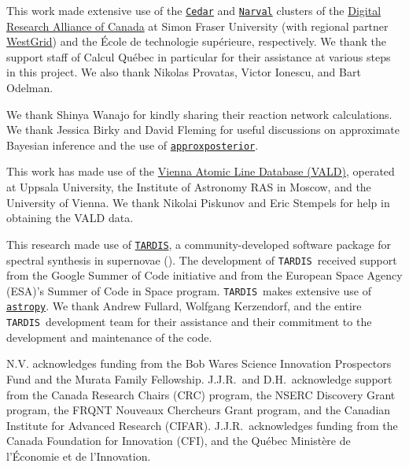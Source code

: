 \documentclass[twocolumn, twocolappendix]{aastex63}
\def\TARDIS{\texttt{TARDIS}}
\def\approxposterior{\texttt{approxposterior}}
\begin{document}
\begin{itemize}
This work made extensive use of the \href{https://docs.alliancecan.ca/wiki/Cedar}{\texttt{Cedar}} and \href{https://docs.alliancecan.ca/wiki/Narval/en}{\texttt{Narval}} clusters of the \href{https://alliancecan.ca/en}{Digital Research Alliance of Canada} at Simon Fraser University (with regional partner \href{https://www.westgrid.ca/}{WestGrid}) and the {\'E}cole de technologie sup{\'e}rieure, respectively. We thank the support staff of Calcul Qu{\'e}bec in particular for their assistance at various steps in this project. We also thank Nikolas Provatas, Victor Ionescu, and Bart Odelman.

We thank Shinya Wanajo for kindly sharing their reaction network calculations. We thank Jessica Birky and David Fleming for useful discussions on approximate Bayesian inference and the use of \href{https://dflemin3.github.io/approxposterior/index.html}{\approxposterior}.

This work has made use of the \href{http://vald.astro.uu.se/~vald/php/vald.php}{Vienna Atomic Line Database (VALD)}, operated at Uppsala University, the Institute of Astronomy RAS in Moscow, and the University of Vienna. We thank Nikolai Piskunov and Eric Stempels for help in obtaining the VALD data.

This research made use of \href{https://tardis-sn.github.io/tardis/index.html}{\TARDIS}, a community-developed software package for spectral synthesis in supernovae (\citealt{kerzendorf14}). The development of \TARDIS~received support from the Google Summer of Code initiative and from the European Space Agency (ESA)'s Summer of Code in Space program. \TARDIS~makes extensive use of \href{https://docs.astropy.org/en/stable/}{\texttt{astropy}}. We thank Andrew Fullard, Wolfgang Kerzendorf, and the entire \TARDIS~development team for their assistance and their commitment to the development and maintenance of the code. 

N.V. acknowledges funding from the Bob Wares Science Innovation Prospectors Fund and the Murata Family Fellowship. J.J.R.\ and D.H.\ acknowledge support from the Canada Research Chairs (CRC) program, the NSERC Discovery Grant program, the FRQNT Nouveaux Chercheurs Grant program, and the Canadian Institute for Advanced Research (CIFAR). J.J.R.\ acknowledges funding from the Canada Foundation for Innovation (CFI), and the Qu\'{e}bec Ministère de l’\'{E}conomie et de l’Innovation.
\newline


\end{itemize}
\end{document}
